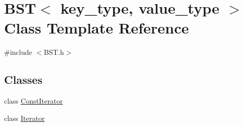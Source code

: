 \hypertarget{class_b_s_t}{}\section{B\+ST$<$ key\+\_\+type, value\+\_\+type $>$ Class Template Reference}
\label{class_b_s_t}


{\ttfamily \#include $<$B\+S\+T.\+h$>$}

\subsection*{Classes}
\begin{DoxyCompactItemize}
\item 
class \mbox{\hyperlink{class_b_s_t_1_1_const_iterator}{Const\+Iterator}}
\item 
class \mbox{\hyperlink{class_b_s_t_1_1_iterator}{Iterator}}
\end{DoxyCompactItemize}
